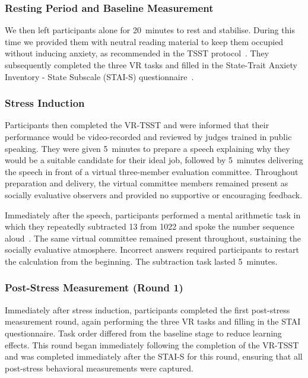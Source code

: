 \subsubsection{Resting Period and Baseline Measurement}
We then left participants alone for 20~minutes to rest and stabilise. During this time we provided them with neutral reading material to keep them occupied without inducing anxiety, as recommended in the TSST protocol~\citep{kirschbaum1993trier}. They subsequently completed the three VR tasks and filled in the State-Trait Anxiety Inventory - State Subscale (STAI-S) questionnaire~\citep{spielberger1971state}.

\subsubsection{Stress Induction}
Participants then completed the VR-TSST and were informed that their performance would be video-recorded and reviewed by judges trained in public speaking. They were given 5~minutes to prepare a speech explaining why they would be a suitable candidate for their ideal job, followed by 5~minutes delivering the speech in front of a virtual three-member evaluation committee. Throughout preparation and delivery, the virtual committee members remained present as socially evaluative observers and provided no supportive or encouraging feedback.

Immediately after the speech, participants performed a mental arithmetic task in which they repeatedly subtracted 13 from 1022 and spoke the number sequence aloud~\citep{kirschbaum1993trier}. The same virtual committee remained present throughout, sustaining the socially evaluative atmosphere. Incorrect answers required participants to restart the calculation from the beginning. The subtraction task lasted 5~minutes.

\subsubsection{Post-Stress Measurement (Round 1)}
Immediately after stress induction, participants completed the first post-stress measurement round, again performing the three VR tasks and filling in the STAI questionnaire. Task order differed from the baseline stage to reduce learning effects. This round began immediately following the completion of the VR-TSST and was completed immediately after the STAI-S for this round, ensuring that all post-stress behavioral measurements were captured.

